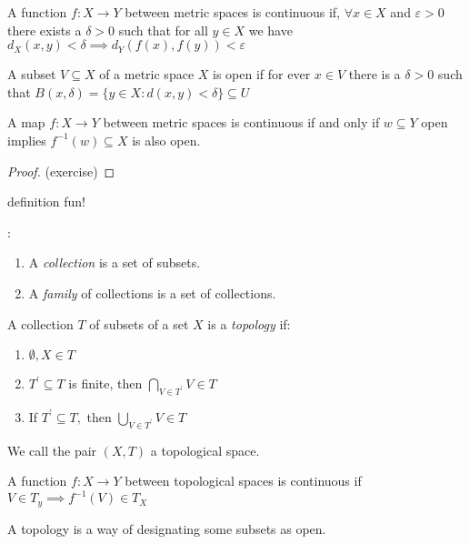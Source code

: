 \begin{definition}
A function $f : X \to Y$ between metric spaces is continuous if, $\forall x \in X$ and $\varepsilon >0 $ there exists a $\delta >0$ such that for all $y \in X$ we have $d_X (x, y) < \delta \implies d_Y(f(x), f(y)) < \varepsilon$	
\end{definition}

A subset $V \subseteq X$ of a metric space $X$ is open if for ever $x \in V$ there is a $\delta >0 $ such that $B(x,\delta) = \{y \in X: d(x,y) < \delta\} \subseteq U$ 

\begin{theorem}
	A map $f:X \to Y$ between metric spaces is continuous if and only if $w \subseteq Y$ open implies $f^{-1}(w) \subseteq X$ is also open.
\end{theorem}

\begin{proof}
	(exercise)
\end{proof}

definition fun! \\
\begin{definition}:
\begin{enumerate}
	\item A \emph{collection} is a set of subsets. 
	\item A \emph{family} of collections is a set of collections.
\end{enumerate}
\end{definition}

\begin{definition}[Topology]
	A collection $T$ of subsets of a set $X$ is a \textit{topology} if:
	\begin{enumerate}
		\item $\emptyset, X \in T$ 
		\item $T^{'} \subseteq T$ is finite, then $\bigcap\limits_{V \in T^{'}} V \in T$ 
		\item If $T^{'} \subseteq T,$ then $\bigcup\limits_{V \in T^{'}} V \in T$
	\end{enumerate}

	We call the pair $(X, T)$ a topological space.
\end{definition}


A function $f:X \to Y$ between topological spaces is continuous if $V \in T_y \implies f^{-1}(V) \in T_X$

\begin{claim*}
	A topology is a way of designating some subsets as open.	
\end{claim*}

